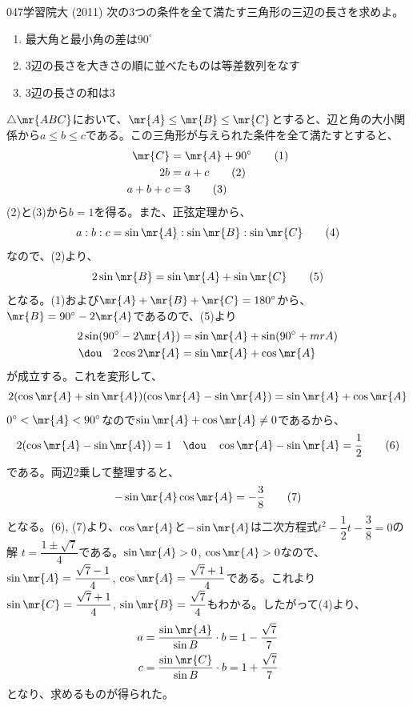 \begin{prob}{047}{}{学習院大 (2011)}
 次の3つの条件を全て満たす三角形の三辺の長さを求めよ。
 \begin{enumerate}
  \renewcommand{\labelenumi}{(\alph{enumi})}
  \item 最大角と最小角の差は$90^\circ$
  \item 3辺の長さを大きさの順に並べたものは等差数列をなす
  \item 3辺の長さの和は3
 \end{enumerate}
\end{prob}

$\triangle\mr{ABC}$において、$\mr{A}\le\mr{B}\le\mr{C}$とすると、辺と角の大小関係から$a\le b\le c$である。この三角形が与えられた条件を全て満たすとすると、
\begin{align*}
 \mr{C}&=\mr{A}+90^\circ \tag{1} \\
 2b&=a+c \tag{2} \\
 a+b+c&=3 \tag{3}
\end{align*}
(2)と(3)から$b=1$を得る。また、正弦定理から、
\[ a:b:c=\sin\mr{A}:\sin\mr{B}:\sin\mr{C} \tag{4} \]
なので、(2)より、
\[ 2\sin\mr{B}=\sin\mr{A}+\sin\mr{C} \tag{5} \]
となる。(1)および$\mr{A}+\mr{B}+\mr{C}=180^\circ$から、$\mr{B}=90^\circ-2\mr{A}$であるので、(5)より
\begin{align*}
 2\sin(90^\circ-2\mr{A})&= \sin\mr{A}+\sin(90^\circ+mr{A}) \\
 \dou\quad 2\cos 2\mr{A} &= \sin\mr{A}+\cos\mr{A}
\end{align*}
が成立する。これを変形して、
\[ 2(\cos\mr{A}+\sin\mr{A})(\cos\mr{A}-\sin\mr{A})=\sin\mr{A}+\cos\mr{A} \]
$0^\circ < \mr{A}<90^\circ$なので$\sin\mr{A}+\cos\mr{A}\neq 0$であるから、
\[ 2(\cos\mr{A}-\sin\mr{A})=1 \quad\dou\quad \cos\mr{A}-\sin\mr{A}=\frac{1}{2} \tag{6} \]
である。両辺2乗して整理すると、
\[-\sin\mr{A}\cos\mr{A}=-\frac{3}{8} \tag{7} \]
となる。(6), (7)より、$\cos\mr{A}$と$-\sin\mr{A}$は二次方程式$t^2-\dfrac{1}{2}t-\dfrac{3}{8}=0$の解 $t=\dfrac{1\pm\sqrt{7}}{4}$である。$\sin\mr{A}>0$, $\cos\mr{A}>0$なので、$\sin\mr{A}=\dfrac{\sqrt{7}-1}{4}$, $\cos\mr{A}=\dfrac{\sqrt{7}+1}{4}$である。これより$\sin\mr{C}=\dfrac{\sqrt{7}+1}{4}$, $\sin\mr{B}=\dfrac{\sqrt{7}}{4}$もわかる。したがって(4)より、
\begin{align*}
 a&=\frac{\sin\mr{A}}{\sin{B}}\cdot b=1-\frac{\sqrt{7}}{7} \\
 c&=\frac{\sin\mr{C}}{\sin{B}}\cdot b=1+\frac{\sqrt{7}}{7} \\
\end{align*}
となり、求めるものが得られた。